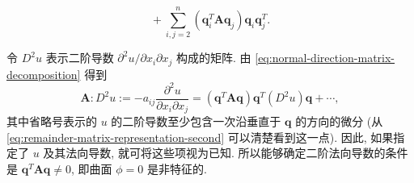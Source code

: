 \begin{equation}\label{eq:remainder-matrix-representation-second}
{}+\sum_{i,j=2}^n(\bm{q}_i^T\bm{A}\bm{q}_j)\bm{q}_i\bm{q}_j^T.
\end{equation}


令 $D^2u$ 表示二阶导数 $\partial^2u/\partial x_i\partial x_j$ 构成的矩阵. 由 \eqref{eq:normal-direction-matrix-decomposition} 得到
\begin{equation}\label{eq:normal-second-derivative-determination}
\bm{A}:D^2u:=-a_{ij}\dfrac{\partial^2u}{\partial x_i\partial x_j}=(\bm{q}^T\bm{A}\bm{q})\bm{q}^T(D^2u)\bm{q}+\cdots,
\end{equation}
其中省略号表示的 $u$ 的二阶导数至少包含一次沿垂直于 $\bm{q}$ 的方向的微分 (从 \eqref{eq:remainder-matrix-representation-second} 可以清楚看到这一点). 因此, 如果指定了 $u$ 及其法向导数, 就可将这些项视为已知. 所以能够确定二阶法向导数的条件是 $\bm{q}^T\bm{A}\bm{q}\ne0$, 即曲面 $\phi=0$ 是非特征的.
